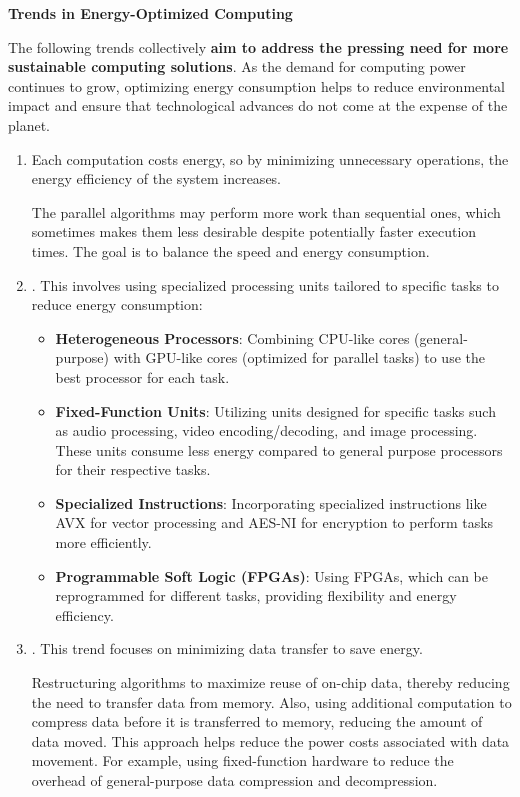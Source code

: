 \begin{flushleft}
    \textcolor{Green3}{ \textbf{Trends in Energy-Optimized Computing}}
\end{flushleft}
The following trends collectively \textbf{aim to address the pressing need for more sustainable computing solutions}. As the demand for computing power continues to grow, optimizing energy consumption helps to reduce environmental impact and ensure that technological advances do not come at the expense of the planet.
\begin{enumerate}
    \item {} Each computation costs energy, so by minimizing unnecessary operations, the energy efficiency of the system increases.

    The parallel algorithms may perform more work than sequential ones, which sometimes makes them less desirable despite potentially faster execution times. The goal is to balance the speed and energy consumption.

    \item {}. This involves using specialized processing units tailored to specific tasks to reduce energy consumption:
    \begin{itemize}
        \item \textbf{Heterogeneous Processors}: Combining CPU-like cores (general-purpose) with GPU-like cores (optimized for parallel tasks) to use the best processor for each task.
        \item \textbf{Fixed-Function Units}: Utilizing units designed for specific tasks such as audio processing, video encoding/decoding, and image processing. These units consume less energy compared to general purpose processors for their respective tasks.
        \item \textbf{Specialized Instructions}: Incorporating specialized instructions like AVX for vector processing and AES-NI for encryption to perform tasks more efficiently.
        \item \textbf{Programmable Soft Logic (FPGAs)}: Using FPGAs, which can be reprogrammed for different tasks, providing flexibility and energy efficiency.
    \end{itemize}
    
    \item {}. This trend focuses on minimizing data transfer to save energy.

    Restructuring algorithms to maximize reuse of on-chip data, thereby reducing the need to transfer data from memory. Also, using additional computation to compress data before it is transferred to memory, reducing the amount of data moved. This approach helps reduce the power costs associated with data movement. For example, using fixed-function hardware to reduce the overhead of general-purpose data compression and decompression.
\end{enumerate}
